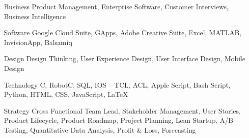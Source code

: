 

\begin{cvskills}

  \cvskill
    {Business} %
    {Product Management, Enterprise Software, Customer Interviews, Business Intelligence} %

  \cvskill
    {Software} %
    {Google Cloud Suite, GApps, Adobe Creative Suite, Excel, MATLAB, InvisionApp, Balsamiq} %

  \cvskill
    {Design} %
    {Design Thinking, User Experience Design, User Interface Design, Mobile Design} %

  \cvskill
    {Technology} %
    {C, RobotC, SQL, IOS – TCL, ACL, Apple Script, Bash Script, Python, HTML, CSS, JavaScript, LaTeX} %

  \cvskill
    {Strategy} %
    {Cross Functional Team Lead, Stakeholder Management, User Stories, Product Lifecycle, Product Roadmap, Project Planning, Lean Startup, A/B Testing, Quantitative Data Analysis, Profit \& Loss, Forecasting} %
\end{cvskills}
